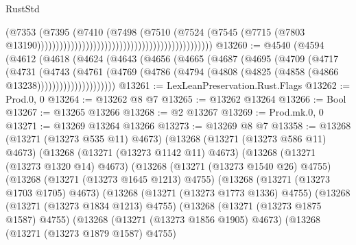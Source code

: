 \begin{lexlean}{RustStd}
\begin{coremodule}
                                                                                (@7353
                                                                                  (@7395
                                                                                    (@7410
                                                                                      (@7498
                                                                                        (@7510
                                                                                          (@7524
                                                                                            (@7545
                                                                                              (@7715
                                                                                                (@7803
                                                                                                  @13190)))))))))))))))))))))))))))))))))))))))))))))))
@13260 := @4540
    (@4594
      (@4612
        (@4618
          (@4624
            (@4643
              (@4656
                (@4665
                  (@4687
                    (@4695
                      (@4709
                        (@4717
                          (@4731
                            (@4743
                              (@4761
                                (@4769
                                  (@4786
                                    (@4794 (@4808 (@4825 (@4858 (@4866 @13238)))))))))))))))))))))
@13261 := LexLeanPreservation.Rust.Flags
@13262 := Prod.{0, 0}
@13264 := @13262 @8 @7
@13265 := @13262 @13264
@13266 := Bool
@13267 := @13265 @13266
@13268 := @2 @13267
@13269 := Prod.mk.{0, 0}
@13271 := @13269 @13264 @13266
@13273 := @13269 @8 @7
@13358 := @13268
    (@13271 (@13273 @535 @11) @4673)
    (@13268
      (@13271 (@13273 @586 @11) @4673)
      (@13268
        (@13271 (@13273 @1142 @11) @4673)
        (@13268
          (@13271 (@13273 @1320 @14) @4673)
          (@13268
            (@13271 (@13273 @1540 @26) @4755)
            (@13268
              (@13271 (@13273 @1645 @1213) @4755)
              (@13268
                (@13271 (@13273 @1703 @1705) @4673)
                (@13268
                  (@13271 (@13273 @1773 @1336) @4755)
                  (@13268
                    (@13271 (@13273 @1834 @1213) @4755)
                    (@13268
                      (@13271 (@13273 @1875 @1587) @4755)
                      (@13268
                        (@13271 (@13273 @1856 @1905) @4673)
                        (@13268
                          (@13271 (@13273 @1879 @1587) @4755)

\end{coremodule}
\end{lexlean}
